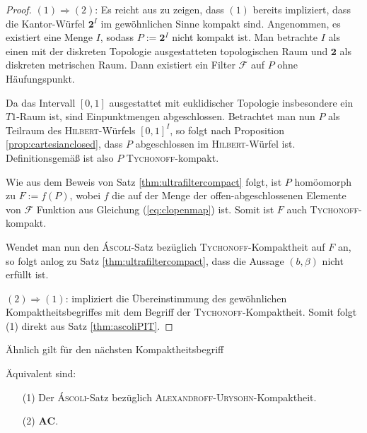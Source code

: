 \begin{proof}
  $(1)\Rightarrow(2) $: Es reicht aus zu zeigen, dass $(1)$ bereits impliziert, dass die Kantor-Würfel $\mathbf{2}^I$ im gewöhnlichen Sinne kompakt sind.
  Angenommen, es existiert eine Menge $I$, sodass $P:= \mathbf{2}^I$ nicht kompakt ist.
  Man betrachte $I$ als einen mit der diskreten Topologie ausgestatteten topologischen Raum und $\mathbf{2}$ als diskreten metrischen Raum.
  Dann existiert ein Filter $\mathcal{F}$ auf $P$ ohne Häufungspunkt.

  Da das Intervall $[0,1]$ ausgestattet mit euklidischer Topologie insbesondere ein $T1$-Raum ist, sind Einpunktmengen abgeschlossen.
  Betrachtet man nun $P$ als Teilraum des \textsc{Hilbert}-Würfels $[0,1]^I$, so folgt nach Proposition \ref{prop:cartesianclosed}, dass $P$ abgeschlossen im \textsc{Hilbert}-Würfel ist.
  Definitionsgemäß ist also $P$ \textsc{Tychonoff}-kompakt.

  Wie aus dem Beweis von Satz \ref{thm:ultrafiltercompact} folgt, ist $P$ homöomorph zu $F:= f(P)$, wobei $f$ die auf der Menge der offen-abgeschlossenen Elemente von $\mathcal{F}$ Funktion aus Gleichung (\ref{eq:clopenmap}) ist.
  Somit ist $F$ auch \textsc{Tychonoff}-kompakt.

  Wendet man nun den \textsc{Áscoli}-Satz bezüglich \textsc{Tychonoff}-Kompaktheit auf $F$ an, so folgt anlog zu Satz \ref{thm:ultrafiltercompact}, dass die Aussage $(b, \beta)$ nicht erfüllt ist.

  $(2)\Rightarrow(1)$: \PIT impliziert die Übereinstimmung des gewöhnlichen Kompaktheitsbegriffes mit dem Begriff der \textsc{Tychonoff}-Kompaktheit. Somit folgt (1) direkt aus Satz \ref{thm:ascoliPIT}.
\end{proof}

Ähnlich gilt für den nächsten Kompaktheitsbegriff

\begin{thm}
  Äquivalent sind:
  \begin{enumerate}
    \item[(1)] Der \textsc{Áscoli}-Satz bezüglich \textsc{Alexandroff}-\textsc{Urysohn}-Kompaktheit.
    \item[(2)] $\mathbf{AC}$.
  \end{enumerate}
\end{thm}

